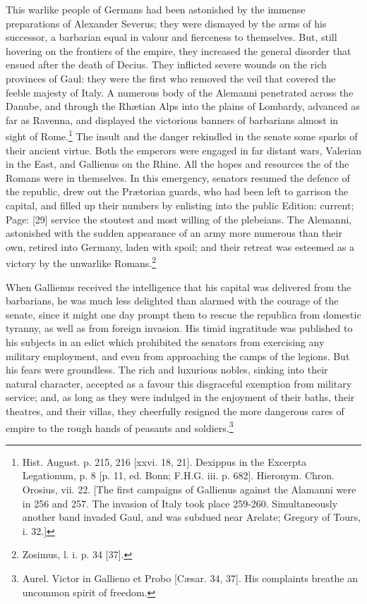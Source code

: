 This warlike people of Germans had been astonished by the immense preparations of Alexander Severus; they were dismayed by the arms of his successor, a barbarian equal in valour and fierceness to themselves. But, still hovering on the frontiers of the empire, they increased the general disorder that ensued after the death of Decius. They inflicted severe wounds on the rich provinces of Gaul: they were the first who removed the veil that covered the feeble majesty of Italy. A numerous body of the Alemanni penetrated across the Danube, and through the Rhætian Alps into the plains of Lombardy, advanced as far as Ravenna, and displayed the victorious banners of barbarians almost in sight of Rome.\footnote{Hist. August. p. 215, 216 [xxvi. 18, 21]. Dexippus in the Excerpta Legationum, p. 8 [p. 11, ed. Bonn; F.H.G. iii. p. 682]. Hieronym. Chron. Orosius, vii. 22. [The first campaigns of Gallienus against the Alamanni were in 256 and 257. The invasion of Italy took place 259-260. Simultaneously another band invaded Gaul, and was subdued near Arelate; Gregory of Tours, i. 32.]} The insult and the danger rekindled in the senate some sparks of their ancient virtue. Both the emperors were engaged in far distant wars, Valerian in the East, and Gallienus on the Rhine. All the hopes and resources the of the Romans were in themselves. In this emergency, senators resumed the defence of the republic, drew out the Prætorian guards, who had been left to garrison the capital, and filled up their numbers by enlisting into the public Edition: current; Page: [29] service the stoutest and most willing of the plebeians. The Alemanni, astonished with the sudden appearance of an army more numerous than their own, retired into Germany, laden with spoil; and their retreat was esteemed as a victory by the unwarlike Romans.\footnote{Zosimus, l. i. p. 34 [37].}

When Gallienus received the intelligence that his capital was delivered from the barbarians, he was much less delighted than alarmed with the courage of the senate, since it might one day prompt them to rescue the republica from domestic tyranny, as well as from foreign invasion. His timid ingratitude was published to his subjects in an edict which prohibited the senators from exercising any military employment, and even from approaching the camps of the legions. But his fears were groundless. The rich and luxurious nobles, sinking into their natural character, accepted as a favour this disgraceful exemption from military service; and, as long as they were indulged in the enjoyment of their baths, their theatres, and their villas, they cheerfully resigned the more dangerous cares of empire to the rough hands of peasants and soldiers.\footnote{Aurel. Victor in Gallieno et Probo [Cæsar. 34, 37]. His complaints breathe an uncommon spirit of freedom.}

